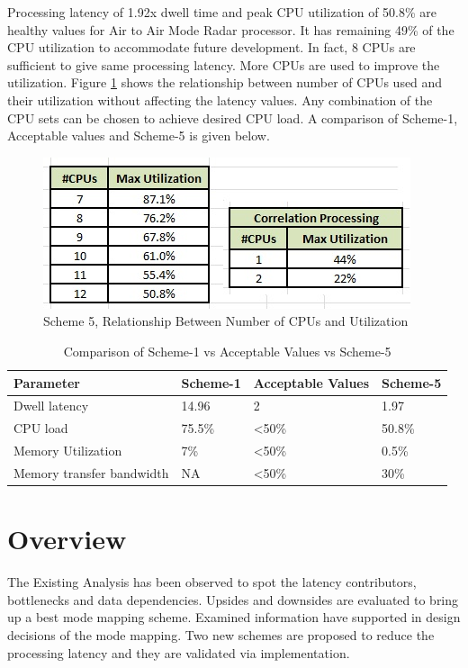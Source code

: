 Processing latency of 1.92x dwell time and peak CPU utilization of 50.8\% are healthy values for Air to Air Mode Radar processor. It has remaining 49\% of the CPU utilization to accommodate future development. In fact, 8 CPUs are sufficient to give same processing latency. More CPUs are used to improve the utilization. Figure \ref{fig:mm:scheme5_summary} shows the relationship between number of CPUs used and their utilization without affecting the latency values. Any combination of the CPU sets can be chosen to achieve desired CPU load. A comparison of  Scheme-1, Acceptable values and Scheme-5 is given below.

\begin{figure}[h!]
	\centering
	\includegraphics[]{figures/scheme5_summary}
	\caption{Scheme 5, Relationship Between Number of CPUs and Utilization}
	\label{fig:mm:scheme5_summary}
\end{figure}

\begin{table}[h!]
	\centering
	\begin{tabular}{|l|l|l|l|} 
	 \hline
	 \textbf{Parameter} & \textbf{Scheme-1} & \textbf{Acceptable Values} & \textbf{Scheme-5}\\
	 \hline
	 Dwell latency &  14.96 & 2 & 1.97 \\ \hline
	 CPU load & 75.5\% & \textless 50\% & 50.8\% \\ \hline
	 Memory Utilization & 7\% & \textless 50\%  & 0.5\% \\ \hline
	 Memory transfer bandwidth & NA & \textless 50\% & 30\%  \\ \hline
	\end{tabular}
	\caption{Comparison of Scheme-1 vs Acceptable Values vs Scheme-5}
	\label{tbl:mm:scheme5_comparison}
\end{table}

\section{Overview}
The Existing Analysis has been observed to spot the latency contributors, bottlenecks and data dependencies. Upsides and downsides are evaluated to bring up a best mode mapping scheme. Examined information have supported in design decisions of the mode mapping. Two new schemes are proposed to reduce the processing latency and they are validated via implementation.


